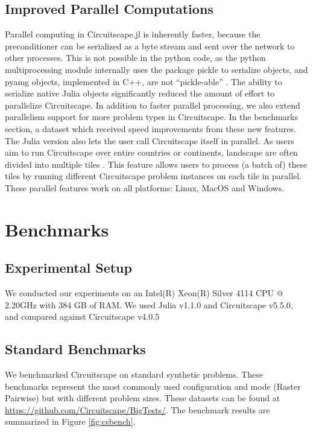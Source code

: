 \documentclass{juliacon}
\begin{document}
\subsection{Improved Parallel Computations}


Parallel computing in Circuitscape.jl is inherently faster, because the preconditioner can be serialized as a byte stream and sent over the network to other processes. This is not possible in the python code, as the python multiprocessing module internally uses the package pickle to serialize objects, and pyamg objects, implemented in C++, are not “pickle-able” \cite{pydoc}. The ability to serialize native Julia objects significantly reduced the amount of effort to parallelize Circuitscape.
In addition to faster parallel processing, we also extend parallelism support for more problem types in Circuitscape. In the benchmarks section, a dataset which received speed improvements from these new features. The Julia version also lets the user call Circuitscape itself in parallel. As users aim to run Circuitscape over entire countries or continents, landscape are often divided into multiple tiles \cite{pelletier2014applying}. This feature allows users to process (a batch of) these tiles by running different Circuitscape problem instances on each tile in parallel. These parallel features work on all platforms: Linux, MacOS and Windows. 

\section{Benchmarks}

\subsection{Experimental Setup}
We conducted our experiments on an Intel(R) Xeon(R) Silver 4114 CPU @ 2.20GHz with 384 GB of RAM. We used Julia v1.1.0 and Circuitscape v5.5.0, and compared against Circuitscape v4.0.5 

\subsection{Standard Benchmarks}
We benchmarked Circuitscape on standard synthetic problems. These benchmarks represent the most commonly used configuration and mode (Raster Pairwise) but with different problem sizes. These datasets can be found at \url{https://github.com/Circuitscape/BigTests/}. The benchmark results are summarized in Figure \ref{fig:csbench}. 
\end{document}
